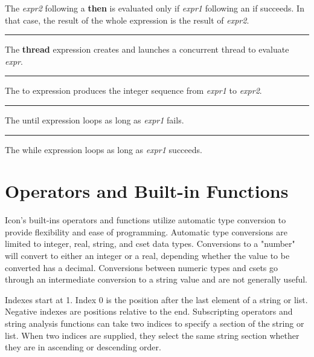 \noindent
{}The \textit{expr2} following a \textsf{\bf then} is evaluated
only if \textit{expr1} following an \textsf{if} succeeds. In that case,
the result of the whole expression is the result of \textit{expr2}.


\bigskip\hrule\vspace{0.1cm}

\noindent
{}The \textsf{\bf thread} expression creates and launches
a concurrent thread to evaluate \textit{expr}.

\bigskip\hrule\vspace{0.1cm}

\noindent
{}The \textsf{to} expression produces the integer
sequence from \textit{expr1} to \textit{expr2}.

\bigskip\hrule\vspace{0.1cm}

\noindent
{}The \textsf{until} expression loops as long
as \textit{expr1} fails.

\bigskip\hrule\vspace{0.1cm}

\noindent
{}The \textsf{while} expression loops as long as
\textit{expr1} succeeds.

\section{Operators and Built-in Functions}

Icon's built-ins operators and functions utilize
automatic type conversion to provide flexibility and ease of
programming. Automatic type conversions are limited to integer, real, string, and cset data
types. Conversions to a "number" will
convert to either an integer or a real, depending whether the value to
be converted has a decimal. Conversions between numeric types and csets
go through an intermediate conversion to a string value and are not
generally useful.

Indexes start at 1. Index 0 is the position after the last element of a
string or list. Negative indexes are positions
relative to the end. Subscripting operators and string analysis
functions can take two indices to specify a section of the string or
list. When two indices are supplied, they select the same string
section whether they are in ascending or descending order.

